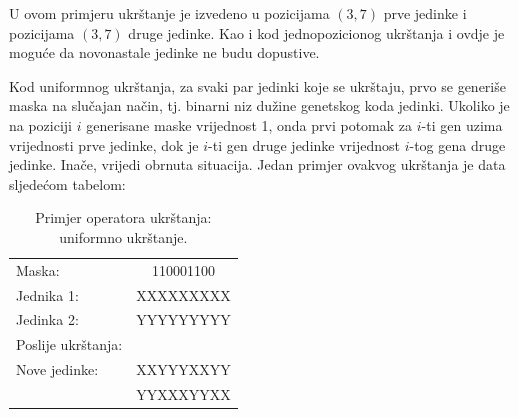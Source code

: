 \documentclass[a4paper, utf8, 11pt, colorlinks]{book}
\theoremstyle{definition}
\begin{document}
U ovom primjeru ukrštanje je izvedeno u pozicijama $(3,7)$ prve jedinke i pozicijama $(3, 7)$ druge jedinke. Kao i kod jednopozicionog ukrštanja i ovdje je moguće da novonastale jedinke ne budu dopustive. 

Kod uniformnog ukrštanja, za svaki par jedinki koje se ukrštaju, prvo se generiše maska na slučajan način, tj. binarni niz dužine genetskog koda jedinki. Ukoliko je na poziciji $i$ generisane maske vrijednost 1, onda prvi potomak za $i$-ti gen uzima vrijednosti prve jedinke, dok je $i$-ti gen druge jedinke vrijednost $i$-tog gena druge jedinke. Inače, vrijedi obrnuta situacija. Jedan primjer ovakvog ukrštanja je data sljedećom tabelom: 

\begin{table}[H]
	\centering
	
	\begin{tabular}{lc}
		Maska:      &   110001100   \\
		Jednika 1:  &	XXXXXXXXX   \\ 
		Jedinka 2: &	YYYYYYYYY   \\
		Poslije ukrštanja:  &       \\ \hline
		Nove jedinke:            &  XXYYYXXYY    \\
		            &  YYXXXYYXX    \\
	\end{tabular}
	\caption{Primjer operatora ukrštanja: uniformno ukrštanje.}
\end{table}
\end{document}
